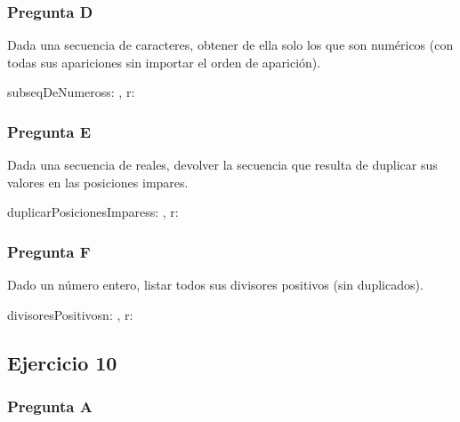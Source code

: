 \subsubsection{Pregunta D}

Dada una secuencia de caracteres, obtener de ella solo los que son numéricos (con todas sus apariciones sin importar el orden de aparición).

\begin{proc}{subseqDeNumeros}{\In s: , \Out r: }{}
\end{proc}

\subsubsection{Pregunta E}

Dada una secuencia de reales, devolver la secuencia que resulta de duplicar sus valores en las posiciones impares.

\begin{proc}{duplicarPosicionesImpares}{\In s: \TLista{\float}, \Out r: \TLista{\float}}{}
\end{proc}

\subsubsection{Pregunta F}

Dado un número entero, listar todos sus divisores positivos (sin duplicados).

\begin{proc}{divisoresPositivos}{\In n: \ent, \Out r: \TLista{\ent}}{}
\end{proc}

\subsection{Ejercicio 10}

\subsubsection{Pregunta A}

